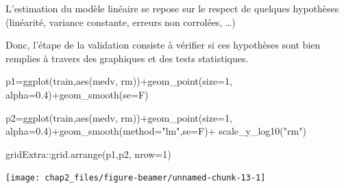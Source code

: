 \documentclass[
  8pt,
  ignorenonframetext,
]{beamer}
\newenvironment{Shaded}{\begin{snugshade}}{\end{snugshade}}
\newcommand{\AttributeTok}[1]{\textcolor[rgb]{0.77,0.63,0.00}{#1}}
\newcommand{\DecValTok}[1]{\textcolor[rgb]{0.00,0.00,0.81}{#1}}
\newcommand{\FloatTok}[1]{\textcolor[rgb]{0.00,0.00,0.81}{#1}}
\newcommand{\FunctionTok}[1]{\textcolor[rgb]{0.00,0.00,0.00}{#1}}
\newcommand{\NormalTok}[1]{#1}
\newcommand{\OtherTok}[1]{\textcolor[rgb]{0.56,0.35,0.01}{#1}}
\newcommand{\SpecialCharTok}[1]{\textcolor[rgb]{0.00,0.00,0.00}{#1}}
\newcommand{\StringTok}[1]{\textcolor[rgb]{0.31,0.60,0.02}{#1}}
\begin{document}
\begin{frame}[fragile]
L'estimation du modèle linéaire se repose sur le respect de quelques
hypothèses (linéarité, variance constante, erreurs non corrolées,
\ldots)\pause

Donc, l'étape de la validation consiste à vérifier si ces hypothèses
sont bien remplies à travers des graphiques et des tests statistiques.
\vspace*{1cm}

\footnotesize

\begin{Shaded}
\begin{Highlighting}[]
\NormalTok{p1}\OtherTok{=}\FunctionTok{ggplot}\NormalTok{(train,}\FunctionTok{aes}\NormalTok{(medv, rm))}\SpecialCharTok{+}\FunctionTok{geom\_point}\NormalTok{(}\AttributeTok{size=}\DecValTok{1}\NormalTok{, }\AttributeTok{alpha=}\FloatTok{0.4}\NormalTok{)}\SpecialCharTok{+}\FunctionTok{geom\_smooth}\NormalTok{(}\AttributeTok{se=}\NormalTok{F)}

\NormalTok{p2}\OtherTok{=}\FunctionTok{ggplot}\NormalTok{(train,}\FunctionTok{aes}\NormalTok{(medv, rm))}\SpecialCharTok{+}\FunctionTok{geom\_point}\NormalTok{(}\AttributeTok{size=}\DecValTok{1}\NormalTok{, }\AttributeTok{alpha=}\FloatTok{0.4}\NormalTok{)}\SpecialCharTok{+}\FunctionTok{geom\_smooth}\NormalTok{(}\AttributeTok{method=}\StringTok{"lm"}\NormalTok{,}\AttributeTok{se=}\NormalTok{F)}\SpecialCharTok{+}
  \FunctionTok{scale\_y\_log10}\NormalTok{(}\StringTok{"rm"}\NormalTok{)}
\end{Highlighting}
\end{Shaded}

\normalsize \vspace*{2cm}
\end{frame}

\begin{frame}[fragile]
\footnotesize

\begin{Shaded}
\begin{Highlighting}[]
\NormalTok{gridExtra}\SpecialCharTok{::}\FunctionTok{grid.arrange}\NormalTok{(p1,p2, }\AttributeTok{nrow=}\DecValTok{1}\NormalTok{)}
\end{Highlighting}
\end{Shaded}

\begin{center}\texttt{[image: chap2\_files/figure-beamer/unnamed-chunk-13-1]} \end{center}

\normalsize
\end{frame}
\end{document}
